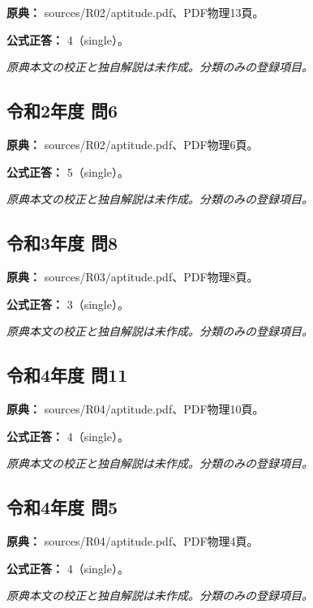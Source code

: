 \noindent\textbf{原典：} sources/R02/aptitude.pdf、PDF物理13頁。

\textbf{公式正答：} 4（single）。

\par\textit{原典本文の校正と独自解説は未作成。分類のみの登録項目。}

\subsection{令和2年度 問6}
\label{q:r02-reg-apt-06}

\noindent\textbf{原典：} sources/R02/aptitude.pdf、PDF物理6頁。

\textbf{公式正答：} 5（single）。

\par\textit{原典本文の校正と独自解説は未作成。分類のみの登録項目。}

\subsection{令和3年度 問8}
\label{q:r03-reg-apt-08}

\noindent\textbf{原典：} sources/R03/aptitude.pdf、PDF物理8頁。

\textbf{公式正答：} 3（single）。

\par\textit{原典本文の校正と独自解説は未作成。分類のみの登録項目。}

\subsection{令和4年度 問11}
\label{q:r04-reg-apt-11}

\noindent\textbf{原典：} sources/R04/aptitude.pdf、PDF物理10頁。

\textbf{公式正答：} 4（single）。

\par\textit{原典本文の校正と独自解説は未作成。分類のみの登録項目。}

\subsection{令和4年度 問5}
\label{q:r04-reg-apt-05}

\noindent\textbf{原典：} sources/R04/aptitude.pdf、PDF物理4頁。

\textbf{公式正答：} 4（single）。

\par\textit{原典本文の校正と独自解説は未作成。分類のみの登録項目。}

